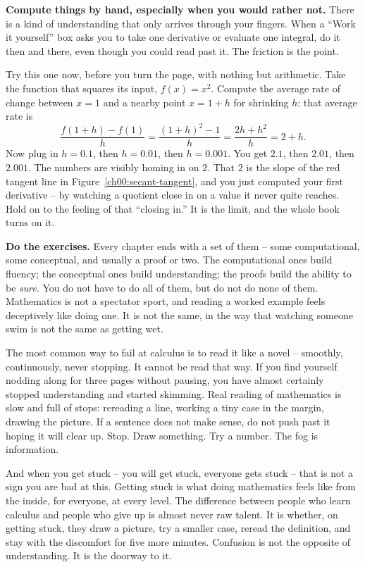\textbf{Compute things by hand, especially when you would rather not.} There is a kind of
understanding that only arrives through your fingers. When a ``Work it yourself'' box asks you to
take one derivative or evaluate one integral, do it then and there, even though you could read past
it. The friction is the point.

\begin{labbox}
Try this one now, before you turn the page, with nothing but arithmetic. Take the function that
squares its input, $f(x)=x^2$. Compute the average rate of change between $x=1$ and a nearby point
$x=1+h$ for shrinking $h$: that average rate is
\[
\frac{f(1+h)-f(1)}{h}=\frac{(1+h)^2-1}{h}=\frac{2h+h^2}{h}=2+h.
\]
Now plug in $h=0.1$, then $h=0.01$, then $h=0.001$. You get $2.1$, then $2.01$, then $2.001$. The
numbers are visibly homing in on $2$. That $2$ is the slope of the red tangent line in
Figure~\ref{ch00:secant-tangent}, and you just computed your first derivative -- by watching a quotient
close in on a value it never quite reaches. Hold on to the feeling of that ``closing in.'' It is the
limit, and the whole book turns on it.
\end{labbox}

\textbf{Do the exercises.} Every chapter ends with a set of them -- some computational, some
conceptual, and usually a proof or two. The computational ones build fluency; the conceptual ones
build understanding; the proofs build the ability to be \emph{sure}. You do not have to do all of
them, but do not do none of them. Mathematics is not a spectator sport, and reading a worked example
feels deceptively like doing one. It is not the same, in the way that watching someone swim is not
the same as getting wet.

\begin{trapbox}
The most common way to fail at calculus is to read it like a novel -- smoothly, continuously, never
stopping. It cannot be read that way. If you find yourself nodding along for three pages without
pausing, you have almost certainly stopped understanding and started skimming. Real reading of
mathematics is slow and full of stops: rereading a line, working a tiny case in the margin, drawing
the picture. If a sentence does not make sense, do not push past it hoping it will clear up. Stop.
Draw something. Try a number. The fog is information.
\end{trapbox}

\begin{recoverybox}
And when you get stuck -- you will get stuck, everyone gets stuck -- that is not a sign you are bad at
this. Getting stuck is what doing mathematics feels like from the inside, for everyone, at every
level. The difference between people who learn calculus and people who give up is almost never raw
talent. It is whether, on getting stuck, they draw a picture, try a smaller case, reread the
definition, and stay with the discomfort for five more minutes. Confusion is not the opposite of
understanding. It is the doorway to it.
\end{recoverybox}

